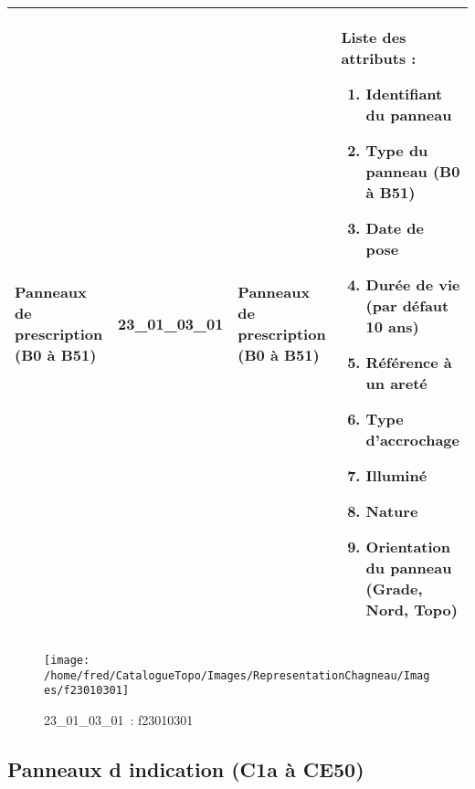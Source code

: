 \documentclass[12pt,titlepage]{book}
\begin{document}
\renewcommand{\arraystretch}{1.2}
\begin{supertabular}{|p{10cm}|c|p{13cm}|p{12cm}|}
 Panneaux de prescription (B0 à B51) & 23\_01\_03\_01 & Panneaux de prescription (B0 à B51) & Liste des attributs :
\begin{enumerate}
  \item Identifiant du panneau  \item Type du panneau (B0 à B51)  \item Date de pose  \item Durée de vie (par défaut 10 ans)  \item Référence à un areté  \item Type d'accrochage  \item Illuminé  \item Nature  \item Orientation du panneau (Grade, Nord, Topo)\end{enumerate}
\\
\hline
\end{supertabular}
\begin{figure}[h!]
  \hfill         %
  \begin{minipage}[t]{3cm}
    \begin{center}
      \texttt{[image: /home/fred/CatalogueTopo/Images/RepresentationChagneau/Images/f23010301]}
      \caption[~23\_01\_03\_01]{\small{23\_01\_03\_01~:} \tiny{f23010301}}\label{f23010301}
    \end{center}
  \end{minipage}
\end{figure}


\subsection{Panneaux d indication (C1a à CE50)}
\noindent
\vspace{\baselineskip}
\end{document}
